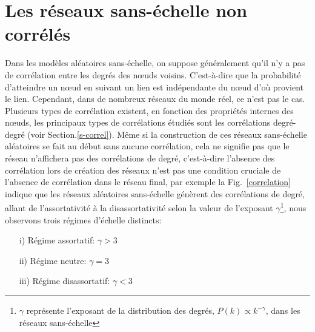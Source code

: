 \section{Les réseaux sans-échelle non corrélés}
Dans les modèles aléatoires sans-échelle, on suppose généralement qu'il n'y a pas de corrélation entre les degrés des nœuds voisins. C'est-à-dire que la probabilité d'atteindre un nœud en suivant un lien est indépendante du nœud d'où provient le lien. Cependant, dans de nombreux réseaux du monde réel, ce n'est pas le cas. Plusieurs types de corrélation existent, en fonction des propriétés internes des nœuds, les principaux types de corrélations étudiés sont les corrélations degré-degré (voir Section.\ref{s-correl}). Même si la construction de ces réseaux sans-échelle aléatoires se fait au début sans aucune corrélation, cela ne signifie pas que le réseau n'affichera pas des corrélations de degré, c'est-à-dire l'absence des corrélation lors de création des réseaux n'est pas une condition cruciale de l'absence de corrélation dans le réseau final, par exemple la Fig.~\ref{correlation} indique que les réseaux aléatoires sans-échelle génèrent des corrélations de degré, allant de l'assortativité à la disassortativité selon la valeur de l'exposant $\gamma$\footnote{$\gamma$ représente l'exposant de la distribution des degrés, $P(k)\propto k^{-\gamma}$, dans les réseaux sans-échelle }, nous observons trois régimes d'échelle distincts:
\begin{itemize}
	\item[i)] Régime assortatif: $\gamma>3$
	\item[ii)]Régime neutre: $\gamma=3$
	\item[iii)] Régime disassortatif: $\gamma<3$
\end{itemize}

